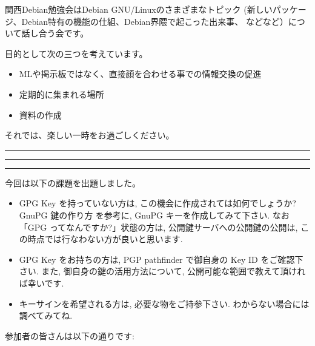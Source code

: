 \documentclass[mingoth,a4paper]{jsarticle}
\begin{document}
\vspace{1em}

関西Debian勉強会はDebian GNU/Linuxのさまざまなトピック
(新しいパッケージ、Debian特有の機能の仕組、Debian界隈で起こった出来事、
などなど）について話し合う会です。

目的として次の三つを考えています。
\begin{itemize}
\item MLや掲示板ではなく、直接顔を合わせる事での情報交換の促進
\item 定期的に集まれる場所
\item 資料の作成
\end{itemize}

それでは、楽しい一時をお過ごしください。

\newpage

\begin{minipage}[b]{0.2\hsize}
  {}
\end{minipage}
\begin{minipage}[b]{0.8\hsize}
\hrule
\vspace{2mm}
\hrule
\setcounter{tocdepth}{1}
\tableofcontents
\vspace{2mm}
\hrule
\end{minipage}




今回は以下の課題を出題しました。
\begin{itemize}
\item %
  GPG Key を持っていない方は, この機会に作成されては如何でしょうか? GnuPG 鍵の作り方 を参考に, GnuPG キーを作成してみて下さい. なお「GPG ってなんですか?」状態の方は, 公開鍵サーバへの公開鍵の公開は, この時点では行なわない方が良いと思います.
\item %
  GPG Key をお持ちの方は, PGP pathfinder で御自身の Key ID をご確認下さい. また, 御自身の鍵の活用方法について, 公開可能な範囲で教えて頂ければ幸いです.
\item %
  キーサインを希望される方は, 必要な物をご持参下さい. わからない場合には調べてみてね.
\end{itemize}

参加者の皆さんは以下の通りです:

\vspace{1em}
\end{document}
